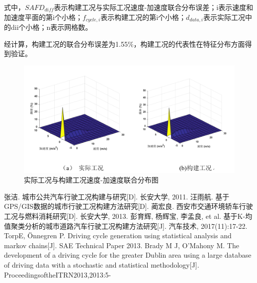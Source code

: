 \documentclass[bwprint]{gmcmthesis}
\begin{document}
式中，$SAFD_{diff}$表示构建工况与实际工况速度-加速度联合分布误差；i表示速度和加速度平面的第i个小格；$f_{cycle,i}$表示构建工况的第i个小格；$d_{data,i}$表示实际工况中的dii个小格；n表示网格数。

经计算，构建工况的联合分布误差为1.55\%，构建工况的代表性在特征分布方面得到验证。

\begin{figure}[htbp] %
\centering
\includegraphics[width=0.7\linewidth,angle=0]{figures/qq.png}
\caption{实际工况与构建工况速度-加速度联合分布图}
\label{f5}
\end{figure}
\newpage
\begin{thebibliography}{9}%
 张洁. 城市公共汽车行驶工况构建与研究[D]. 长安大学, 2011.
 汪雨航. 基于GPS/GIS数据的城市行驶工况构建方法研究[D]. 
 蔺宏良. 西安市交通环境轿车行驶工况与燃料消耗研究[D]. 长安大学, 2013.
 彭育辉, 杨辉宝, 李孟良, et al. 基于K-均值聚类分析的城市道路汽车行驶工况构建方法研究[J]. 汽车技术, 2017(11):17-22.
 TorpE, Önnegren P. Driving cycle generation using statistical analysis and markov chains[J]. SAE Technical Paper 2013.
 Brady M J, O’Mahony M. The development of a driving cycle for the greater Dublin area using a large database of driving data with a stochastic and statistical methodology[J]. ProceedingsoftheITRN2013,2013:5-
\end{thebibliography}


%
%


\newpage
\appendix
\setcounter{page}{1} %
\end{document}
